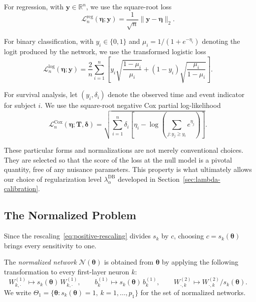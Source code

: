 \documentclass[twoside,11pt]{article}
\newcommand{\lamDB}{\lambda_\alpha^{\mathrm{DB}}}
\newcommand{\bth}{\boldsymbol{\theta}}
\newcommand{\bet}{\boldsymbol{\eta}}
\newcommand{\by}{\mathbf{y}}
\newcommand{\R}{\mathbb{R}}
\newcommand{\Nrm}{\mathcal{N}}
\newcommand{\Thetaone}{\Theta_{1}}
\begin{document}
For regression, with $\by\in\R^n$, we use the square-root loss
\begin{equation*}
    \mathcal{L}_n^{\mathrm{reg}}(\bet;\by)=
    \frac{1}{\sqrt n}\|\by-\bet\|_2.
\end{equation*}

For binary classification, with $y_i\in\{0,1\}$ and $\mu_i=1/(1+e^{-\eta_i})$ denoting the logit produced by the network, we use the transformed logistic loss
\begin{equation*}
    \mathcal{L}_n^{\mathrm{log}}(\bet;\by)
    =\frac{2}{n}\sum_{i=1}^n\left[y_i\sqrt{\frac{1-\mu_i}{\mu_i}}+(1-y_i)\sqrt{\frac{\mu_i}{1-\mu_i}}\right].
\end{equation*}

For survival analysis, let $(y_i,\delta_i)$ denote the observed time and
event indicator for subject $i$. We use the square-root negative Cox partial log-likelihood
\begin{equation*}
    \mathcal{L}_n^{\mathrm{Cox}}(\bet;\mathbf T,\boldsymbol\delta)
    =\sqrt{\sum_{i=1}^n\delta_i
    \left[
        \eta_i- \log\left(\sum_{j: y_j\geq y_i}e^{\eta_j}\right)
    \right]}.
\end{equation*}

These particular forms and normalizations are not merely conventional
choices. They are selected so that the score of the loss at the null model is a pivotal quantity, free of any nuisance parameters. This property is what ultimately allows our choice of regularization level $\lamDB$ developed in Section~\ref{sec:lambda-calibration}.

\subsection{The Normalized Problem}\label{sec:formulations}
Since the rescaling~\eqref{eq:positive-rescaling} divides $s_k$ by $c$, choosing $c=s_k(\bth)$ brings every sensitivity to one.

\begin{definition}\label{def:normalized}
The \emph{normalized network} $\Nrm(\bth)$ is obtained from $\bth$ by applying the following transformation to every first-layer neuron $k$:
\begin{equation*}
    W^{(1)}_{k,\cdot}\mapsto s_k(\bth)\,W^{(1)}_{k,\cdot},\qquad
    b^{(1)}_k\mapsto s_k(\bth)\,b^{(1)}_k,\qquad
    W^{(2)}_{\cdot,k}\mapsto W^{(2)}_{\cdot,k}/s_k(\bth).
\end{equation*}
We write $\Thetaone=\{\bth:s_k(\bth)=1,\ k=1,\ldots,p_1\}$ for the set of normalized networks.
\end{definition}
\end{document}
